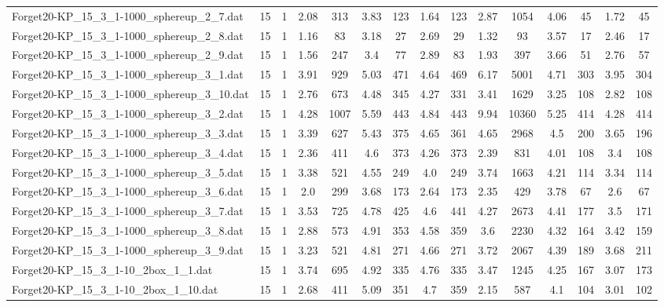 \begin{table}[!ht]
{\begin{tabular}{lcccccccccccccc}
Forget20-KP\_15\_3\_1-1000\_sphereup\_2\_7.dat & 15 & 1 & 2.08 & 313 & 3.83 & 123 & 1.64 & 123 & 2.87 & 1054 & 4.06 & 45 & 1.72 & 45 \\
Forget20-KP\_15\_3\_1-1000\_sphereup\_2\_8.dat & 15 & 1 & 1.16 & 83 & 3.18 & 27 & 2.69 & 29 & 1.32 & 93 & 3.57 & 17 & 2.46 & 17 \\
Forget20-KP\_15\_3\_1-1000\_sphereup\_2\_9.dat & 15 & 1 & 1.56 & 247 & 3.4 & 77 & 2.89 & 83 & 1.93 & 397 & 3.66 & 51 & 2.76 & 57 \\
Forget20-KP\_15\_3\_1-1000\_sphereup\_3\_1.dat & 15 & 1 & 3.91 & 929 & 5.03 & 471 & 4.64 & 469 & 6.17 & 5001 & 4.71 & 303 & 3.95 & 304 \\
Forget20-KP\_15\_3\_1-1000\_sphereup\_3\_10.dat & 15 & 1 & 2.76 & 673 & 4.48 & 345 & 4.27 & 331 & 3.41 & 1629 & 3.25 & 108 & 2.82 & 108 \\
Forget20-KP\_15\_3\_1-1000\_sphereup\_3\_2.dat & 15 & 1 & 4.28 & 1007 & 5.59 & 443 & 4.84 & 443 & 9.94 & 10360 & 5.25 & 414 & 4.28 & 414 \\
Forget20-KP\_15\_3\_1-1000\_sphereup\_3\_3.dat & 15 & 1 & 3.39 & 627 & 5.43 & 375 & 4.65 & 361 & 4.65 & 2968 & 4.5 & 200 & 3.65 & 196 \\
Forget20-KP\_15\_3\_1-1000\_sphereup\_3\_4.dat & 15 & 1 & 2.36 & 411 & 4.6 & 373 & 4.26 & 373 & 2.39 & 831 & 4.01 & 108 & 3.4 & 108 \\
Forget20-KP\_15\_3\_1-1000\_sphereup\_3\_5.dat & 15 & 1 & 3.38 & 521 & 4.55 & 249 & 4.0 & 249 & 3.74 & 1663 & 4.21 & 114 & 3.34 & 114 \\
Forget20-KP\_15\_3\_1-1000\_sphereup\_3\_6.dat & 15 & 1 & 2.0 & 299 & 3.68 & 173 & 2.64 & 173 & 2.35 & 429 & 3.78 & 67 & 2.6 & 67 \\
Forget20-KP\_15\_3\_1-1000\_sphereup\_3\_7.dat & 15 & 1 & 3.53 & 725 & 4.78 & 425 & 4.6 & 441 & 4.27 & 2673 & 4.41 & 177 & 3.5 & 171 \\
Forget20-KP\_15\_3\_1-1000\_sphereup\_3\_8.dat & 15 & 1 & 2.88 & 573 & 4.91 & 353 & 4.58 & 359 & 3.6 & 2230 & 4.32 & 164 & 3.42 & 159 \\
Forget20-KP\_15\_3\_1-1000\_sphereup\_3\_9.dat & 15 & 1 & 3.23 & 521 & 4.81 & 271 & 4.66 & 271 & 3.72 & 2067 & 4.39 & 189 & 3.68 & 211 \\
Forget20-KP\_15\_3\_1-10\_2box\_1\_1.dat & 15 & 1 & 3.74 & 695 & 4.92 & 335 & 4.76 & 335 & 3.47 & 1245 & 4.25 & 167 & 3.07 & 173 \\
Forget20-KP\_15\_3\_1-10\_2box\_1\_10.dat & 15 & 1 & 2.68 & 411 & 5.09 & 351 & 4.7 & 359 & 2.15 & 587 & 4.1 & 104 & 3.01 & 102 \\

\end{tabular}}
\end{table}
